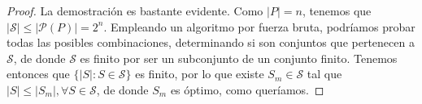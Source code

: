 \begin{proof}
    La demostración es bastante evidente. Como $|P| = n$, tenemos que $|\mathcal S| \leq |\mathcal P (P)| = 2^n$. 
    Empleando un algoritmo por fuerza bruta, podríamos probar todas las posibles combinaciones, determinando si
    son conjuntos que pertenecen a $\mathcal S$, de donde $\mathcal S$ es finito por ser un subconjunto de un conjunto finito. 
    Tenemos entonces que $\{|S| : S \in \mathcal S\}$ es finito, por lo que existe $S_m \in \mathcal S$ tal que
    $|S| \leq |S_m|, \forall S \in \mathcal S$, de donde $S_m$ es óptimo, como queríamos. 
\end{proof}






